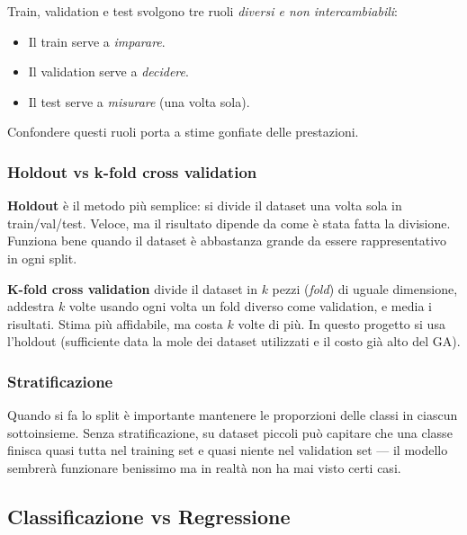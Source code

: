 \documentclass[11pt,a4paper]{article}
\begin{document}
\begin{concetto}
Train, validation e test svolgono tre ruoli \emph{diversi e non
intercambiabili}:
\begin{itemize}
    \item Il train serve a \emph{imparare}.
    \item Il validation serve a \emph{decidere}.
    \item Il test serve a \emph{misurare} (una volta sola).
\end{itemize}
Confondere questi ruoli porta a stime gonfiate delle prestazioni.
\end{concetto}

\subsubsection{Holdout vs k-fold cross validation}

\textbf{Holdout} è il metodo più semplice: si divide il dataset una volta
sola in train/val/test. Veloce, ma il risultato dipende da come è stata
fatta la divisione. Funziona bene quando il dataset è abbastanza grande
da essere rappresentativo in ogni split.

\textbf{K-fold cross validation} divide il dataset in $k$ pezzi
(\emph{fold}) di uguale dimensione, addestra $k$ volte usando ogni volta
un fold diverso come validation, e media i risultati. Stima più affidabile,
ma costa $k$ volte di più. In questo progetto si usa l'holdout (sufficiente
data la mole dei dataset utilizzati e il costo già alto del GA).

\subsubsection{Stratificazione}

Quando si fa lo split è importante mantenere le proporzioni delle classi
in ciascun sottoinsieme. Senza stratificazione, su dataset piccoli può
capitare che una classe finisca quasi tutta nel training set e quasi
niente nel validation set --- il modello sembrerà funzionare benissimo
ma in realtà non ha mai visto certi casi.

\subsection{Classificazione vs Regressione}
\end{document}
